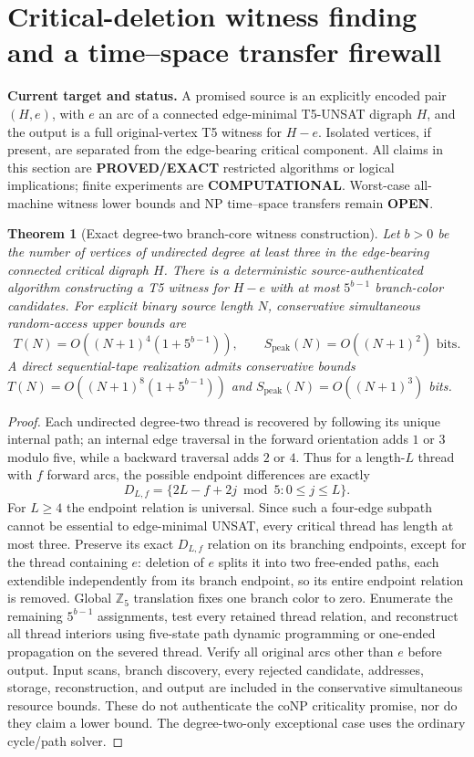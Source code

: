 \documentclass[11pt]{article}
\newtheorem{theorem}{Theorem}
\begin{document}
\section{Critical-deletion witness finding and a time--space transfer firewall}
\noindent\textbf{Current target and status.}
A promised source is an explicitly encoded pair $(H,e)$, with $e$ an arc
of a connected edge-minimal T5-UNSAT digraph $H$, and the output is a
full original-vertex T5 witness for $H-e$. Isolated vertices, if
present, are separated from the edge-bearing critical component.
All claims in this section are \textbf{PROVED/EXACT} restricted
algorithms or logical implications; finite experiments are
\textbf{COMPUTATIONAL}. Worst-case all-machine witness lower bounds
and NP time--space transfers remain \textbf{OPEN}.

\begin{theorem}[Exact degree-two branch-core witness construction]
Let $b>0$ be the number of vertices of undirected degree at least
three in the edge-bearing connected critical digraph $H$.
There is a deterministic source-authenticated algorithm constructing
a T5 witness for $H-e$ with at most $5^{b-1}$ branch-color candidates.
For explicit binary source length $N$, conservative simultaneous
random-access upper bounds are
\[
T(N)=O((N+1)^4(1+5^{b-1})),\qquad
S_{\mathrm{peak}}(N)=O((N+1)^2)\text{ bits}.
\]
A direct sequential-tape realization admits conservative bounds
$T(N)=O((N+1)^8(1+5^{b-1}))$ and
$S_{\mathrm{peak}}(N)=O((N+1)^3)$ bits.
\end{theorem}
\begin{proof}
Each undirected degree-two thread is recovered by following its
unique internal path; an internal edge traversal in the forward
orientation adds $1$ or $3$ modulo five, while a backward traversal
adds $2$ or $4$. Thus for a length-$L$ thread with $f$ forward arcs,
the possible endpoint differences are exactly
\[
D_{L,f}=\{2L-f+2j\bmod5:0\le j\le L\}.
\]
For $L\ge4$ the endpoint relation is universal. Since such a
four-edge subpath cannot be essential to edge-minimal UNSAT,
every critical thread has length at most three. Preserve its
exact $D_{L,f}$ relation on its branching endpoints, except for
the thread containing $e$: deletion of $e$ splits it into two
free-ended paths, each extendible independently from its branch
endpoint, so its entire endpoint relation is removed.
Global $\mathbb Z_5$ translation fixes one branch color to zero.
Enumerate the remaining $5^{b-1}$ assignments, test every retained
thread relation, and reconstruct all thread interiors using
five-state path dynamic programming or one-ended propagation
on the severed thread. Verify all original arcs other than $e$
before output. Input scans, branch discovery, every rejected
candidate, addresses, storage, reconstruction, and output are
included in the conservative simultaneous resource bounds.
These do not authenticate the coNP criticality promise, nor do
they claim a lower bound. The degree-two-only exceptional case
uses the ordinary cycle/path solver.
\end{proof}
\end{document}
